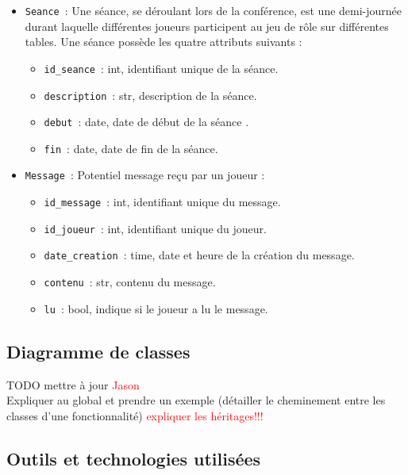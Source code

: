 \documentclass[11pt]{article}
\begin{document}
\begin{itemize}
    \item \texttt{Seance}~: Une séance, se déroulant lors de la conférence, est une demi-journée durant laquelle différentes joueurs participent au jeu de rôle sur différentes tables. Une séance possède les quatre attributs suivants :
    \begin{itemize}[label=, font=\small]
        \item \texttt{id\_seance}~: int, identifiant unique de la séance.
        \item \texttt{description}~: str, description de la séance.
        \item \texttt{debut}~: date, date de début de la séance .
        \item \texttt{fin}~: date, date de fin de la séance.
    \end{itemize}
    
    \item \texttt{Message}~: Potentiel message reçu par un joueur  :
    \begin{itemize}[label=, font=\small]
        \item \texttt{id\_message}~: int, identifiant unique du message.
        \item \texttt{id\_joueur}~: int, identifiant unique du joueur.
        \item \texttt{date\_creation}~: time, date et heure de la création du message.
        \item \texttt{contenu}~: str, contenu du message.
        \item \texttt{lu}~: bool, indique si le joueur a lu le message.
    \end{itemize}
    
\end{itemize}




\subsection{Diagramme de classes}

TODO mettre à jour \textcolor{red}{Jason} \\
Expliquer au global et prendre un exemple (détailler le cheminement entre les classes d'une fonctionnalité) 
\textcolor{red}{expliquer les héritages!!!}





\subsection{Outils et technologies utilisées}
\end{document}
